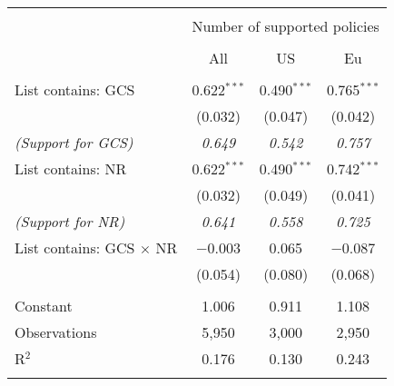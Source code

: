 
\begin{tabular}{@{\extracolsep{5pt}}lccc} 
\\[-1.8ex]\hline 
\hline \\[-1.8ex] 
 & \multicolumn{3}{c}{Number of supported policies} \\ 
\cline{2-4} 
\\[-1.8ex] & All & US & Eu \\ 
\hline \\[-1.8ex] 
 List contains: GCS & 0.622$^{***}$ & 0.490$^{***}$ & 0.765$^{***}$ \\ 
  & (0.032) & (0.047) & (0.042) \\ 
\textit{(Support for GCS)} & \textit{ 0.649 } & \textit{ 0.542 } & \textit{ 0.757 }\\
  List contains: NR & 0.622$^{***}$ & 0.490$^{***}$ & 0.742$^{***}$ \\ 
  & (0.032) & (0.049) & (0.041) \\ 
\textit{(Support for NR)} & \textit{ 0.641 } & \textit{ 0.558 } & \textit{ 0.725 }\\
  List contains: GCS $\times$ NR & $-$0.003 & 0.065 & $-$0.087 \\ 
  & (0.054) & (0.080) & (0.068) \\ 
 \hline \\[-1.8ex] 
Constant & 1.006 & 0.911 & 1.108 \\ 
Observations & 5,950 & 3,000 & 2,950 \\ 
R$^{2}$ & 0.176 & 0.130 & 0.243 \\ 
\hline 
\hline \\[-1.8ex] 
\end{tabular} 